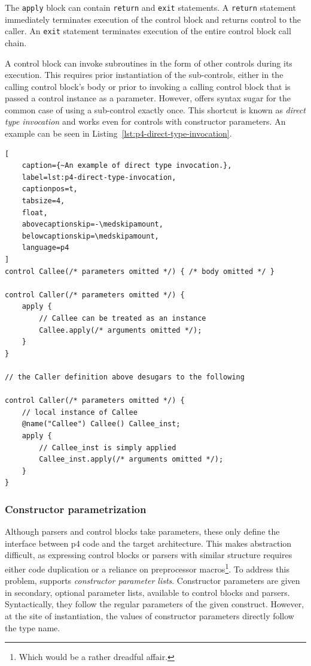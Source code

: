 The \texttt{apply} block can contain \texttt{return} and \texttt{exit}
statements. A \texttt{return} statement immediately terminates execution of the
control block and returns control to the caller. An \texttt{exit} statement
terminates execution of the entire control block call chain.

A control block can invoke subroutines in the form of other controls during its
execution. This requires prior instantiation of the sub-controls, either in the
calling control block's body or prior to invoking a calling control block that
is passed a control instance as a parameter. However, \pfs offers syntax
sugar for the common
case of using a sub-control exactly once. This shortcut is known as \emph{direct
type invocation} and works even for controls with constructor
parameters. An example can be seen in
Listing~\ref{lst:p4-direct-type-invocation}.

\begin{lstlisting}[
	caption={~An example of direct type invocation.},
	label=lst:p4-direct-type-invocation,
	captionpos=t,
	tabsize=4,
	float,
	abovecaptionskip=-\medskipamount,
	belowcaptionskip=\medskipamount,
	language=p4
]
control Callee(/* parameters omitted */) { /* body omitted */ }

control Caller(/* parameters omitted */) {
	apply {
		// Callee can be treated as an instance
		Callee.apply(/* arguments omitted */);
	}
}

// the Caller definition above desugars to the following

control Caller(/* parameters omitted */) {
	// local instance of Callee
	@name("Callee") Callee() Callee_inst;
	apply {
		// Callee_inst is simply applied
		Callee_inst.apply(/* arguments omitted */);
	}
}

\end{lstlisting}

\subsubsection*{Constructor parametrization}

Although parsers and control blocks take parameters, these only define the
interface between \acrshort{p4} code and the target architecture. This makes
abstraction difficult, as expressing control blocks or parsers with similar
structure requires either code duplication or a reliance on preprocessor
macros\footnote{Which would be a rather dreadful affair.}. To address this
problem, \pfs supports \emph{constructor parameter lists}. Constructor
parameters are given in secondary, optional parameter lists, available to
control blocks and parsers. Syntactically, they follow the regular parameters of
the given construct. However, at the site of instantiation, the values of
constructor parameters directly follow the type name.

